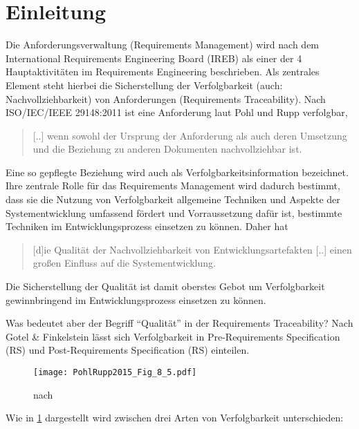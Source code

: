 \section{Einleitung}
\label{sec:Einleitung}
Die Anforderungsverwaltung (Requirements Management) wird nach dem International Requirements Engineering Board (IREB)  als einer der 4 Hauptaktivitäten im Requirements Engineering beschrieben.
Als zentrales Element steht hierbei die Sicherstellung der Verfolgbarkeit (auch: Nachvollziehbarkeit) von Anforderungen (Requirements Traceability). \cite{Pohl2015BasiswissenIREB-Standard}
Nach ISO/IEC/IEEE 29148:2011 ist eine Anforderung laut Pohl und Rupp verfolgbar,
\begin{quote}
[..] wenn sowohl der Ursprung der Anforderung als auch deren Umsetzung und die Beziehung zu anderen Dokumenten nachvollziehbar ist. \cite[S.48]{Pohl2015BasiswissenIREB-Standard}
\end{quote}
Eine so gepflegte Beziehung wird auch als Verfolgbarkeitsinformation bezeichnet. Ihre zentrale Rolle für das Requirements Management wird dadurch bestimmt, dass sie die Nutzung von Verfolgbarkeit allgemeine Techniken und Aspekte der Systementwicklung umfassend fördert und Vorraussetzung dafür ist, bestimmte Techniken im Entwicklungsprozess einsetzen zu können. \cite{Pohl2008RequirementsTechniken} Daher hat 
\begin{quote}
[d]ie Qualität der Nachvollziehbarkeit von Entwicklungsartefakten [..] einen großen Einfluss auf die Systementwicklung. \cite[S.507]{Pohl2008RequirementsTechniken}
\end{quote}
Die Sicherstellung der Qualität ist damit oberstes Gebot um Verfolgbarkeit gewinnbringend im Entwicklungsprozess einsetzen zu können. 

Was bedeutet aber der Begriff \enquote{Qualität} in der Requirements Traceability? Nach Gotel \& Finkelstein lässt sich Verfolgbarkeit in Pre-Requirements Specification (RS) und Post-Requirements Specification (RS) einteilen. 

\begin{figure}[!htb]
  \centering
  \texttt{[image: PohlRupp2015\_Fig\_8\_5.pdf]}
  \caption{nach \cite[Fig. 8.5]{Pohl2015BasiswissenIREB-Standard}}
  \label{fig:pohlrupp_prepostrs}
\end{figure}

Wie in \ref{fig:pohlrupp_prepostrs} dargestellt wird zwischen drei Arten von Verfolgbarkeit unterschieden:


